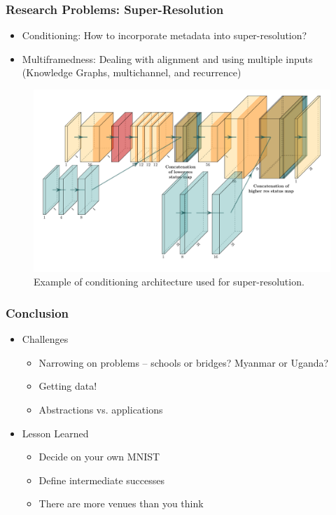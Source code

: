 \documentclass[10pt,mathserif]{beamer}
\begin{document}
\begin{frame}
  \frametitle{Research Problems: Super-Resolution}
  \begin{itemize}
  \item Conditioning: How to incorporate metadata into super-resolution?
  \item Multiframedness: Dealing with alignment and using multiple inputs
    (Knowledge Graphs, multichannel, and recurrence)
  \end{itemize}
  \begin{figure}[ht]
    \centering
    \includegraphics[width=0.6\paperwidth]{figures/conditioning_network}
    \caption{Example of conditioning architecture used for super-resolution. \label{fig:label} }
\end{figure}
\end{frame}

\begin{frame}
  \frametitle{Conclusion}
  \begin{itemize}
    \item Challenges
    \begin{itemize}
      \item Narrowing on problems -- schools or bridges? Myanmar or Uganda?
      \item Getting data!
      \item Abstractions vs. applications
    \end{itemize}
  \item Lesson Learned
    \begin{itemize}
      \item Decide on your own MNIST
      \item Define intermediate successes
      \item There are more venues than you think
    \end{itemize}
  \end{itemize}
\end{frame}
\end{document}

